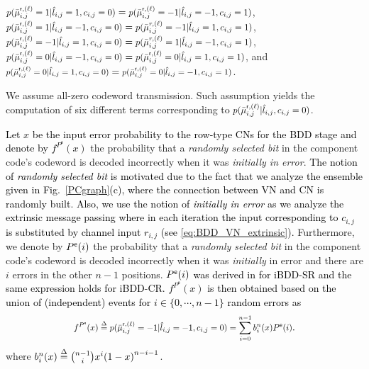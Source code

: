 \documentclass[journal]{IEEEtran}
\newcommand{\mep}{{x}}
\newcommand{\row}{\mathsf{r}}
\newcommand{\Pue}{P^{\mathsf{e}}}
\newcommand{\SHm}{\textcolor{black}}
\newcommand{\AG}{\textcolor{black}}
\let\originalleft\left
\let\originalright\right
\renewcommand{\left}{\mathopen{}\mathclose\bgroup\originalleft}
\renewcommand{\right}{\aftergroup\egroup\originalright}
\newcommand\scalemath[2]{\scalebox{#1}{\mbox{\ensuremath{\displaystyle #2}}}}   %
\begin{document}
$\scalemath{0.9}{p( {\bar \mu _{i,j}^{\row,(\ell )}=1|{\hat l_{i,j}=1},{c_{i,j}} = 0} )}=\scalemath{0.9}{ p( {\bar \mu _{i,j}^{\row,(\ell )}=-1|{\hat l_{i,j}=-1},{c_{i,j}} = 1} )}$, $\scalemath{0.9}{ p( {\bar \mu _{i,j}^{\row,(\ell )}=1|{\hat l_{i,j}=-1},{c_{i,j}} = 0} )}=\scalemath{0.9}{ p( {\bar \mu _{i,j}^{r,(\ell )}=-1|{\hat l_{i,j}=1},{c_{i,j}} = 1} )}$, $\scalemath{0.9}{p( {\bar \mu _{i,j}^{\row,(\ell )}=-1|{\hat l_{i,j}=1},{c_{i,j}} = 0} )}=\scalemath{0.9}{p( {\bar \mu _{i,j}^{r,(\ell )}=1|{\hat l_{i,j}=-1},{c_{i,j}} = 1} )}$, $\scalemath{0.9}{p( {\bar \mu _{i,j}^{\row,(\ell )}=0|{\hat l_{i,j}=-1},{c_{i,j}} = 0} )}=\scalemath{0.9}{p( {\bar \mu _{i,j}^{\row,(\ell )}=0|{\hat l_{i,j}=1},{c_{i,j}} = 1} )}$, and $\scalemath{0.85}{p( {\bar \mu _{i,j}^{\row,(\ell )}=0|{\hat l_{i,j}=1},{c_{i,j}} = 0} )}=\scalemath{0.85}{p( {\bar \mu _{i,j}^{\row,(\ell )}=0|{\hat l_{i,j}=-1},{c_{i,j}} = 1})}$.

We assume all-zero codeword transmission. Such assumption yields the computation of six different terms corresponding to $\scalemath{0.9}{p( {\bar \mu _{i,j}^{\row,(\ell )}|{\hat l_{i,j}},{c_{i,j}} = 0})}$.

\SHm{Let $\mep$ be  the input error probability to the row-type CNs for the BDD stage and  denote by $f^{\Pue}(\mep)$} the probability that a \emph{randomly selected bit} in the component code's codeword is decoded incorrectly when it was \emph{initially in error}. \SHm{The notion of \emph{randomly selected bit} is motivated due to the fact that we analyze the ensemble given in Fig.~\ref{PCgraph}(c), where the connection between VN and CN is randomly built.  Also, we use the notion of \emph{initially in error} as we analyze the extrinsic message passing where in each iteration the input corresponding to $c_{i,j}$ is substituted by channel input $r_{i,j}$ (see \eqref{eq:BDD_VN_extrinsic}).}
Furthermore, we denote by $\Pue\left( i \right)$ the probability that a \emph{randomly selected bit} in the component code's codeword is decoded incorrectly when it was \emph{initially} in error and there are $i$ errors in the other $n-1$ positions. \AG{$\Pue\left( i \right)$ was derived   in \cite[Eq. (5)]{sheikhTCOM19}  for iBDD-SR and the same expression holds for iBDD-CR. 
$f^{\Pue}(\mep)$ is then obtained based on the union of (independent) events for  $i \in \{0,\cdots,n-1\}$ random errors  as}
\begin{align}\label{pe} 
\scalemath{0.86}{ f^{\Pue}(\mep) \buildrel \Delta \over =  p(\bar \mu _{i,j}^{\row,(\ell )}=-1|{\hat l_{i,j}}=-1, c_{i,j}=0) =  \sum\limits_{i = 0}^{n - 1}   b^{n}_i(x) {\Pue\left( i \right)}}.
\end{align} 
where $b^{n}_i(x)\buildrel \Delta \over  = {{n-1}\choose{i}} {\mep^i}{\left( {1 - \mep} \right)^{n - i - 1}}$.
\end{document}
